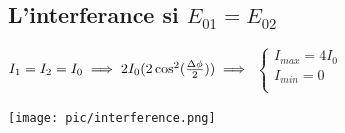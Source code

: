 \documentclass[12pt]{book}
\begin{document}
            \subsection*{L'interferance si $E_{01} = E_{02}$}
                \begin{center}
                    \begin{minipage}{0.49\linewidth}
                        $ I_1=I_2=I_0 \implies 2I_0(2\cos^2(\frac{\Delta\phi}{2})) \\ \implies$ 
                        $\begin{cases}
                            I_{max}=4I_0\\
                            I_{min}=0\\
                        \end{cases}$
                    \end{minipage}
                    \begin{minipage}{0.49\linewidth}
                        \texttt{[image: pic/interference.png]}                      
                    \end{minipage}
                \end{center}
\end{document}
